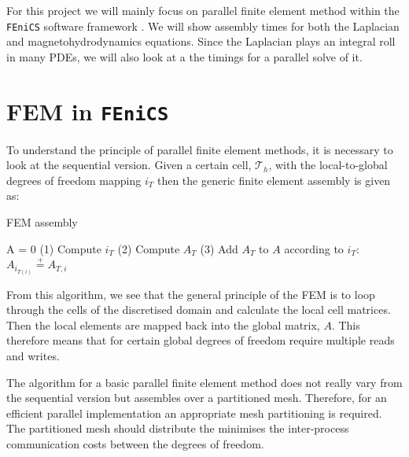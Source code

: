 \documentclass[11pt]{article}
\newcommand{\fenics}{{\tt FEniCS} }
\begin{document}
For this project we will mainly focus on parallel finite element method within the \fenics  software framework \cite{wells2012automated}. We will show assembly times for both the Laplacian and magnetohydrodynamics equations. Since the Laplacian plays an integral roll in many PDEs, we will also look at a the timings for a parallel solve of it.


\section{FEM in \fenics}

To understand the principle of parallel finite element methods, it is necessary to look at the sequential version. Given a certain cell, $\mathcal{T}_h$, with the local-to-global degrees of freedom mapping $i_T$ then the generic finite element assembly is given as:
\begin{algorithm}

FEM assembly
    \begin{algorithmic}[1]
    \State A = 0
        \State (1) Compute $i_T$
        \State (2) Compute $A_T$
        \State (3) Add $A_T$ to $A$ according to $i_T$:
            \State $ A_{i_{T(i)}} \stackrel{+}{=} A_{T,i}$
        \EndFor
    \EndFor
    \end{algorithmic}
\end{algorithm}

From this algorithm, we see that the general principle of the FEM is to loop through the cells of the discretised domain and calculate the local cell matrices. Then the local elements are mapped back into the global matrix, $A$. This therefore means that for certain global degrees of freedom require multiple reads and writes.

The algorithm for a basic parallel finite element method does not really vary from the sequential version but assembles over a partitioned mesh. Therefore, for an efficient parallel implementation an appropriate mesh partitioning is required. The partitioned mesh should distribute the minimises the inter-process communication costs between the degrees of freedom.



\end{document}
